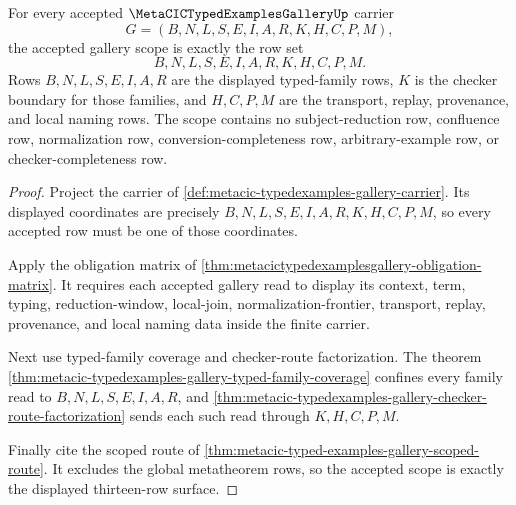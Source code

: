 \begin{theorem}
\label{thm:metacic-typedexamples-gallery-scope-rows}
For every accepted $\MetaCICTypedExamplesGalleryUp$ carrier
$$
G=(B,N,L,S,E,I,A,R,K,H,C,P,M),
$$
the accepted gallery scope is exactly the row set
$$
B,N,L,S,E,I,A,R,K,H,C,P,M .
$$
Rows $B,N,L,S,E,I,A,R$ are the displayed typed-family rows, $K$ is the checker boundary for those families, and $H,C,P,M$ are the transport, replay, provenance, and local naming rows. The scope contains no subject-reduction row, confluence row, normalization row, conversion-completeness row, arbitrary-example row, or checker-completeness row.
\end{theorem}
\begin{proof}
Project the carrier of \autoref{def:metacic-typedexamples-gallery-carrier}. Its displayed coordinates are precisely $B,N,L,S,E,I,A,R,K,H,C,P,M$, so every accepted row must be one of those coordinates.

Apply the obligation matrix of \autoref{thm:metacictypedexamplesgallery-obligation-matrix}. It requires each accepted gallery read to display its context, term, typing, reduction-window, local-join, normalization-frontier, transport, replay, provenance, and local naming data inside the finite carrier.

Next use typed-family coverage and checker-route factorization. The theorem \autoref{thm:metacic-typedexamples-gallery-typed-family-coverage} confines every family read to $B,N,L,S,E,I,A,R$, and \autoref{thm:metacic-typedexamples-gallery-checker-route-factorization} sends each such read through $K,H,C,P,M$.

Finally cite the scoped route of \autoref{thm:metacic-typed-examples-gallery-scoped-route}. It excludes the global metatheorem rows, so the accepted scope is exactly the displayed thirteen-row surface.
\end{proof}

